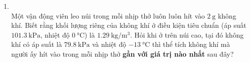 \begin{enumerate}[label=\bfseries Câu \arabic*:, leftmargin=1.7cm]
\item {}\\
Một vận động viên leo núi trong mỗi nhịp thở luôn luôn hít vào $\SI{2}{\gram}$ không khí. Biết rằng khối lượng riêng của không khí ở điều kiện tiêu chuẩn (áp suất $\SI{101.3}{\kilo\pascal}$, nhiệt độ $\SI{0}{\celsius}$) là $\SI{1.29}{\kilogram/\meter^3}$. Hỏi khi ở trên núi cao, tại đó không khí có áp suất là $\SI{79.8}{\kilo\pascal}$ và nhiệt độ $\SI{-13}{\celsius}$ thì thể tích không khí mà người ấy hít vào trong mỗi nhịp thở \textbf{gần với giá trị nào nhất} sau đây?


\end{enumerate}
